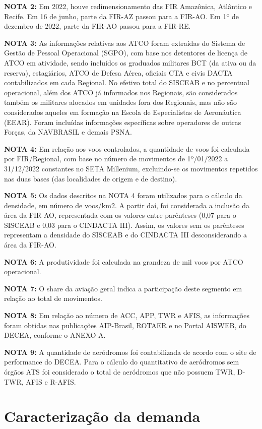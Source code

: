\documentclass[
]{book}
\theoremstyle{definition}
\theoremstyle{definition}
\theoremstyle{definition}
\theoremstyle{definition}
\theoremstyle{remark}
\begin{document}
\textbf{NOTA 2:} Em 2022, houve redimensionamento das FIR Amazônica, Atlântico e Recife. Em 16 de junho, parte da FIR-AZ passou para a FIR-AO. Em 1º de dezembro de 2022, parte da FIR-AO passou para a FIR-RE.

\textbf{NOTA 3:} As informações relativas aos ATCO foram extraídas do Sistema de Gestão de Pessoal Operacional (SGPO), com base nos detentores de licença de ATCO em atividade, sendo incluídos os graduados militares BCT (da ativa ou da reserva), estagiários, ATCO de Defesa Aérea, oficiais CTA e civis DACTA contabilizados em cada Regional. No efetivo total do SISCEAB e no percentual operacional, além dos ATCO já informados nos Regionais, são considerados também os militares alocados em unidades fora dos Regionais, mas não são considerados aqueles em formação na Escola de Especialistas de Aeronáutica (EEAR). Foram incluídas informações específicas sobre operadores de outras Forças, da NAVBRASIL e demais PSNA.

\textbf{NOTA 4:} Em relação aos voos controlados, a quantidade de voos foi calculada por FIR/Regional, com base no número de movimentos de 1º/01/2022 a 31/12/2022 constantes no SETA Millenium, excluindo-se os movimentos repetidos nas duas bases (das localidades de origem e de destino).

\textbf{NOTA 5:} Os dados descritos na NOTA 4 foram utilizados para o cálculo da densidade, em número de voos/km2. A partir daí, foi considerada a inclusão da área da FIR-AO, representada com os valores entre parênteses (0,07 para o SISCEAB e 0,03 para o CINDACTA III). Assim, os valores sem os parênteses representam a densidade do SISCEAB e do CINDACTA III desconsiderando a área da FIR-AO.

\textbf{NOTA 6:} A produtividade foi calculada na grandeza de mil voos por ATCO operacional.

\textbf{NOTA 7:} O share da aviação geral indica a participação deste segmento em relação ao total de movimentos.

\textbf{NOTA 8:} Em relação ao número de ACC, APP, TWR e AFIS, as informações foram obtidas nas publicações AIP-Brasil, ROTAER e no Portal AISWEB, do DECEA, conforme o ANEXO A.

\textbf{NOTA 9:} A quantidade de aeródromos foi contabilizada de acordo com o site de performance do DECEA. Para o cálculo do quantitativo de aeródromos sem órgãos ATS foi considerado o total de aeródromos que não possuem TWR, D-TWR, AFIS e R-AFIS.

\hypertarget{caracterizauxe7uxe3o-da-demanda}{%
\section{Caracterização da demanda}\label{caracterizauxe7uxe3o-da-demanda}}
\end{document}
